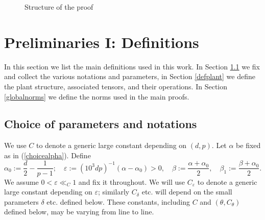 \documentclass[11 pt,reqno]{amsart}
\theoremstyle{definition}
\theoremstyle{remark}
\numberwithin{equation}{section}
\begin{document}
{\begin{figure}
\caption{Structure of the proof}\label{flowchart}
\end{figure} 
 \section{Preliminaries I: Definitions}\label{prep} In this section we list the main definitions used in this work. In Section \ref{notations} we fix and collect the various notations and parameters, in Section \ref{defplant} we define the plant structure, associated tensors, and their operations. In Section \ref{globalnorms} we define the norms used in the main  proofs.
 \subsection{Choice of parameters and notations}\label{notations} We use $C$ to denote a generic large constant depending on $(d,p)$. Let $\alpha$ be fixed as in (\ref{choicealpha}). Define \begin{equation}\label{subcrit}\alpha_0:=\frac{d}{2}-\frac{1}{p-1};\quad\varepsilon:=(10^3dp)^{-1}(\alpha-\alpha_0)>0,\quad \beta:=\frac{\alpha+\alpha_0}{2},\quad \beta_1:=\frac{\beta+\alpha_0}{2}.\end{equation} We assume $0<\varepsilon\ll_C1$ and fix it throughout. We will use $C_\varepsilon$ to denote a generic large constant depending on $\varepsilon$; similarly $C_\delta$ etc. will depend on the small parameters $\delta$ etc. defined below. These constants, including $C$ and $(\theta,C_\theta)$ defined below, may be varying from line to line.
 
}
\end{document}
